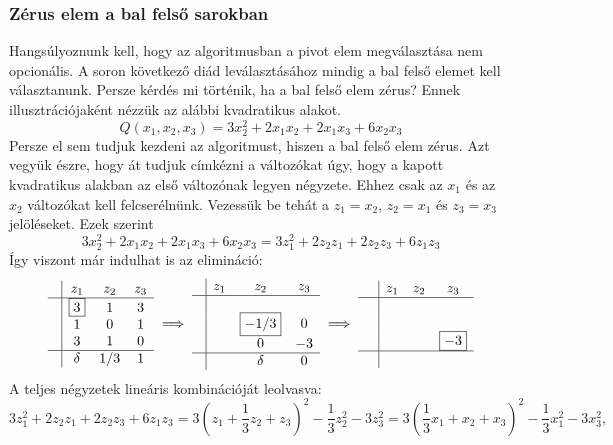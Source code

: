 \documentclass[9pt, a4paper, showtrims]{memoir}
\theoremstyle{plain}
\theoremstyle{remark}
\theoremstyle{definition}
\begin{document}
\subsubsection{Zérus elem a bal felső sarokban}
Hangsúlyoznunk kell, hogy az algoritmusban a pivot elem megválasztása nem opcionális. 
A soron következő diád leválasztásához mindig a bal felső elemet kell választanunk.
Persze kérdés mi történik, ha a bal felső elem zérus?
Ennek illusztrációjaként nézzük az alábbi kvadratikus alakot.
\[
    Q\left( x_1,x_2,x_3 \right)=
    3x_2^2+
    2x_1x_2+2x_1x_3+
    6x_2x_3
\]
Persze el sem tudjuk kezdeni az algoritmust, hiszen a bal felső elem zérus.
Azt vegyük észre, hogy át tudjuk címkézni a változókat úgy, 
hogy a kapott kvadratikus alakban az első változónak legyen négyzete.
Ehhez csak az $x_1$ és az $x_2$ változókat kell felcserélnünk.
Vezessük be tehát a $z_1=x_2$, $z_2=x_1$ és $z_3=x_3$ jelöléseket.
Ezek szerint 
\[
    3x_2^2+
    2x_1x_2+2x_1x_3+
    6x_2x_3
    =
    3z_1^2+
    2z_2z_1+2z_2z_3+
    6z_1z_3
\]
Így viszont már indulhat is az elimináció:
\[
\begin{array}{c|ccc}
     & z_1       & z_2 & z_3 \\
     \hline
     & \boxed{3} & 1   & 3   \\
     & 1         & 0   & 1   \\
     & 3         & 1   & 0   \\
    \hline
    & \delta     & 1/3   & 1 
\end{array}
\implies
\begin{array}{c|ccc}
     & z_1& z_2  & z_3 \\
     \hline
     & &                &     \\
     & & \boxed{-1/3}      & 0   \\
     & & 0              & -3   \\
     \hline
     & & \delta         & 0
\end{array}
\implies
\begin{array}{c|ccc}
     & z_1 & z_2 & z_3      \\
     \hline
     &     &     &          \\
     &     &     &          \\
     &     &     & \boxed{-3}\\
    \hline
    \phantom{\delta}
\end{array}
\]
A teljes négyzetek lineáris kombinációját leolvasva:
\[
    3z_1^2+
    2z_2z_1+2z_2z_3+
    6z_1z_3
    =
    3\left( z_1+\frac{1}{3}z_2+z_3 \right)^2-\frac{1}{3}z_2^2-3z_3^2
    =
    3\left( \frac{1}{3}x_1+x_2+x_3 \right)^2-\frac{1}{3}x_1^2-3x_3^2,
\]
\end{document}

